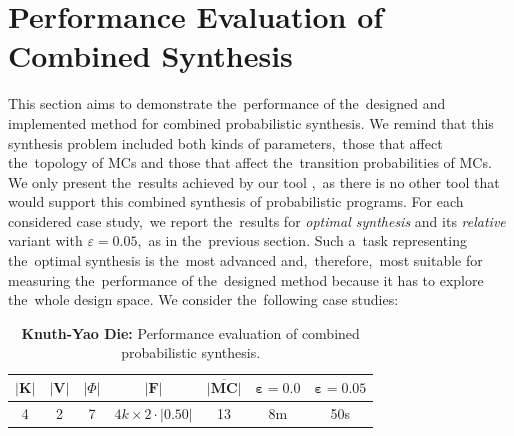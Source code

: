 \section{Performance Evaluation of Combined Synthesis}
This section aims to demonstrate the~performance of the~designed and implemented method for combined probabilistic synthesis.
We remind that this synthesis problem included both kinds of parameters,~those that affect the~topology of MCs and those that affect the~transition probabilities of MCs.
We only present the~results achieved by our tool \toolname{},~as there is no other tool that would support this combined synthesis of probabilistic programs.
For each considered case study,~we report the~results for \textit{optimal synthesis} and its \textit{relative} variant with $\varepsilon = 0.05$,~as in the~previous section.
Such a~task representing the~optimal synthesis is the~most advanced and,~therefore,~most suitable for measuring the~performance of the~designed method because it has to explore the~whole design space.
We consider the~following case studies:

\begin{table}[h!]
\centering
\begin{tabular}{|c|c|c|c|c|c|c|}
\hline
$\lvert \mathbf{K} \rvert$ & $\lvert \mathbf{V} \rvert$ & $\lvert \varPhi \rvert$ & $\lvert \mathcal{\mathbf{F}} \rvert$ & $\overline{\mathbf{\lvert MC \rvert}}$ & $\mathbf{\varepsilon = 0.0}$ & $\mathbf{\varepsilon = 0.05}$ \\ \hline
4 & 2 & 7 & $4k \times 2 \cdot \lvert 0.50 \rvert$ & 13 & 8m & 50s \\ \hline
\end{tabular}
\caption{\textbf{Knuth-Yao Die:} Performance evaluation of combined probabilistic synthesis.}
\end{table}

\vspace*{-0.4cm}
